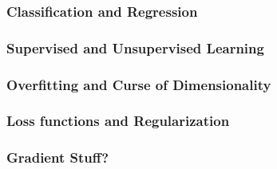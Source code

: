 
\subsubsection{Classification and Regression}


\subsubsection{Supervised and Unsupervised Learning}


\subsubsection{Overfitting and Curse of Dimensionality}


\subsubsection{Loss functions and Regularization}


\subsubsection{Gradient Stuff?}




